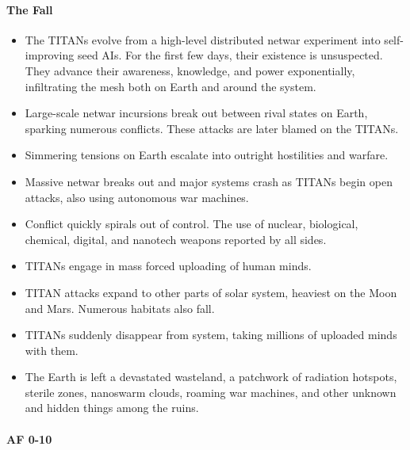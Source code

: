 \paragraph{ The Fall}

\begin{itemize}
\item The TITANs evolve from a high-level distributed netwar
  experiment into self-improving seed AIs.  For the first few days,
  their existence is unsuspected.  They advance their awareness,
  knowledge, and power exponentially, infiltrating the mesh both on
  Earth and around the system.
\item Large-scale netwar incursions break out between rival states on
  Earth, sparking numerous conflicts. These attacks are later blamed
  on the TITANs.
\item Simmering tensions on Earth escalate into outright hostilities
  and warfare.
\item Massive netwar breaks out and major systems crash as TITANs
  begin open attacks, also using autonomous war machines.
\item Conflict quickly spirals out of control. The use of nuclear,
  biological, chemical, digital, and nanotech weapons reported by all
  sides.
\item TITANs engage in mass forced uploading of human minds.
\item TITAN attacks expand to other parts of solar system, heaviest on
  the Moon and Mars. Numerous habitats also fall.
\item TITANs suddenly disappear from system, taking millions of
  uploaded minds with them.
\item The Earth is left a devastated wasteland, a patchwork of
  radiation hotspots, sterile zones, nanoswarm clouds, roaming war
  machines, and other unknown and hidden things among the ruins.
\end{itemize}

\paragraph{AF 0-10}

